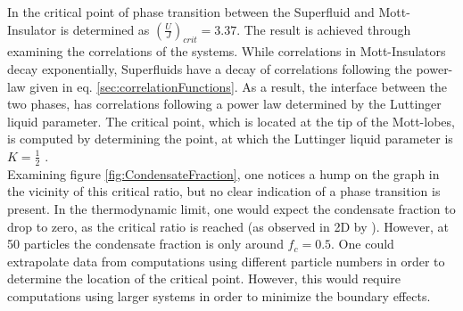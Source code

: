 In \cite{Kuhner2000} the critical point of phase transition between the Superfluid and Mott-Insulator is determined as $\left( \frac{U}{J} \right)_{crit} = 3.37$. The result is achieved through examining the correlations of the systems. While correlations in Mott-Insulators decay exponentially, Superfluids have a decay of correlations following the power-law given in eq. \eqref{sec:correlationFunctions}. As a result, the interface between the two phases, has correlations following a power law determined by the Luttinger liquid parameter. The critical point, which is located at the tip of the Mott-lobes, is computed by determining the point, at which the Luttinger liquid parameter is $K =  \frac{1}{2}$ \cite{Kuhner2000}.\\
Examining figure \ref{fig:CondensateFraction}, one notices a hump on the graph in the vicinity of this critical ratio, but no clear indication of a phase transition is present. In the thermodynamic limit, one would expect the condensate fraction to drop to zero, as the critical ratio is reached (as observed in 2D by \cite{Spielman2008}). However, at 50 particles the condensate fraction is only around $ f_c = 0.5$. One could extrapolate data from computations using different particle numbers in order to determine the location of the critical point. However, this would require computations using larger systems in order to minimize the boundary effects.


